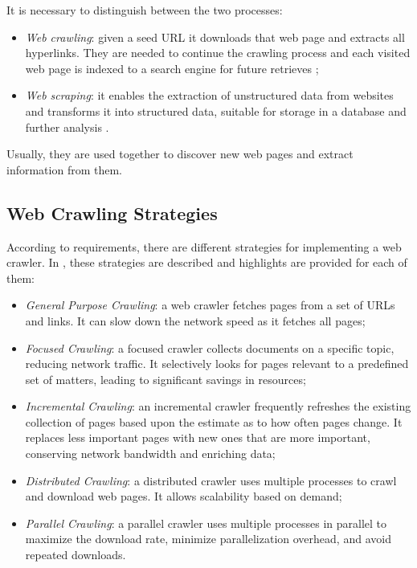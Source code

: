 \documentclass[../thesis.tex]{subfiles}
\begin{document}
It is necessary to distinguish between the two processes:
\begin{itemize}
    \item \textit{Web crawling}: given a seed \acrshort{URL} it downloads that web page and extracts all hyperlinks. They are needed to continue the crawling process and each visited web page is indexed to a search engine for future retrieves \cite{article:review_web_crawler_2013};
    \item \textit{Web scraping}: it enables the extraction of unstructured data from websites and transforms it into structured data, suitable for storage in a database and further analysis \cite{article:web_scraping_crawling_2021}.
\end{itemize}

Usually, they are used together to discover new web pages and extract information from them.

\subsection{Web Crawling Strategies}
According to requirements, there are different strategies for implementing a web crawler. In \cite{article:review_web_crawler_2013, article:web_crawler_types_2014}, these strategies are described and highlights are provided for each of them:
\begin{itemize}
    \item \textit{General Purpose Crawling}: a web crawler fetches pages from a set of URLs and links. It can slow down the network speed as it fetches all pages;
    \item \textit{Focused Crawling}: a focused crawler collects documents on a specific topic, reducing network traffic. It selectively looks for pages relevant to a predefined set of matters, leading to significant savings in resources;
    \item \textit{Incremental Crawling}: an incremental crawler frequently refreshes the existing collection of pages based upon the estimate as to how often pages change. It replaces less important pages with new ones that are more important, conserving network bandwidth and enriching data;
    \item \textit{Distributed Crawling}: a distributed crawler uses multiple processes to crawl and download web pages. It allows scalability based on demand;
    \item \textit{Parallel Crawling}: a parallel crawler uses multiple processes in parallel to maximize the download rate, minimize parallelization overhead, and avoid repeated downloads.
\end{itemize}
\end{document}
